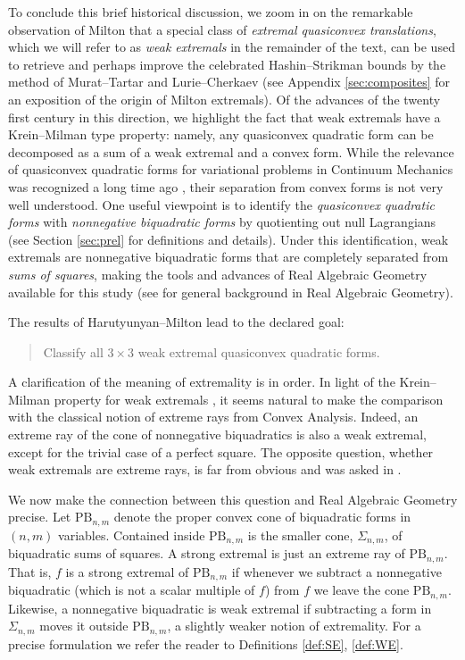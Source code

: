 \documentclass[a4paper]{article}
\numberwithin{equation}{section}
\theoremstyle{definition}
\theoremstyle{remark}
\newcommand{\pbnm}{\mathrm{PB}_{n,m}}
\begin{document}
To conclude this brief historical discussion, we zoom in on the remarkable observation of Milton \cite{MiltonCPAM} that a special class of \emph{extremal quasiconvex translations}, which we will refer to as \emph{weak extremals} in the remainder of the text, can be used to retrieve and perhaps improve the celebrated Hashin--Strikman bounds \cite{hashin1962variational,hashin1963variational} by the method of Murat--Tartar \cite{MuratTartar} and Lurie--Cherkaev \cite{lurie1984exact} (see Appendix \ref{sec:composites} for an exposition of the origin of Milton extremals). Of the advances of the twenty first century in this direction, we highlight the fact that weak extremals have a Krein--Milman type property: namely, any quasiconvex quadratic form can be decomposed as a sum of a weak extremal and a convex form. While the relevance of quasiconvex quadratic forms for variational problems in Continuum Mechanics was recognized a long time ago \cite{morrey52,vanhovezbMATH03046021}, their separation from convex forms is not very well understood. One useful viewpoint is to identify the \emph{quasiconvex quadratic forms} with \emph{nonnegative biquadratic forms} by quotienting out null Lagrangians (see Section \ref{sec:prel} for definitions and details). Under this identification, weak extremals are nonnegative biquadratic forms that are completely separated from \emph{sums of squares}, making the tools and advances of Real Algebraic Geometry available for this study \cite{zbMATH07102076,GGMzbMATH06572970,BS2020,KS2018,Quarez2015} (see \cite{convex_algebraic_geometry,real_alg_geom_BCR} for general background in Real Algebraic Geometry). 

The results of Harutyunyan--Milton \cite{HMcalcvar,HMarma,HarutyunyanMiltonCPAM} lead to the declared goal:
\begin{quote}
    Classify all $3\times 3$ weak extremal quasiconvex quadratic forms.
\end{quote}
A clarification of the meaning of extremality is in order. In light of the Krein--Milman property for weak extremals \cite[Sec. 6]{MiltonKM}, it seems natural to make the comparison with the classical notion of extreme rays from Convex Analysis. Indeed, an extreme ray of the cone of nonnegative biquadratics is also a weak extremal, except for the trivial case of a perfect square. The opposite question, whether weak extremals are extreme rays, is far from obvious and was asked in \cite{HarutyunyanMiltonCPAM}. 

We now make the connection between this question and Real Algebraic Geometry precise.  Let $\pbnm$ denote the proper convex cone of biquadratic forms in $(n,m)$ variables. Contained inside $\pbnm$ is the smaller cone, $\Sigma_{n,m}$, of biquadratic sums of squares.  A strong extremal is just an extreme ray of $\pbnm$. That is, $f$ is a strong extremal of $\pbnm$ if whenever we subtract a nonnegative biquadratic (which is not a scalar multiple of $f$) from $f$ we leave the cone $\pbnm$. Likewise, a nonnegative biquadratic is weak extremal if subtracting a form in $\Sigma_{n,m}$ moves it outside $\pbnm$, a slightly weaker notion of extremality.  For a precise formulation we refer the reader to Definitions \ref{def:SE}, \ref{def:WE}.
\end{document}
